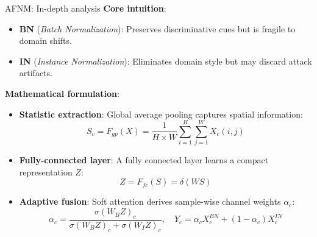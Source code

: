 \begin{frame}[shrink=10]{AFNM: In-depth analysis}
    \footnotesize
    \textbf{Core intuition}: 
    \begin{itemize}
        \item \textbf{BN} (\textit{Batch Normalization}): Preserves discriminative cues but is fragile to domain shifts.
        \item \textbf{IN} (\textit{Instance Normalization}): Eliminates domain style but may discard attack artifacts.
    \end{itemize}
    \vspace{0.2em}
    \textbf{Mathematical formulation}:
    \begin{itemize}
        \item \textbf{Statistic extraction}: Global average pooling captures spatial information:
        \vspace{-0.5em}
        \begin{equation*}
            S_c = F_{gp}(X) = \frac{1}{H \times W} \sum_{i=1}^{H} \sum_{j=1}^{W} X_c(i,j)
        \end{equation*}
        \item \textbf{Fully-connected layer}: A fully connected layer learns a compact representation $Z$:
        \vspace{-0.5em}
        \begin{equation*}
            Z = F_{fc}(S) = \delta(WS)
        \end{equation*}
        \item \textbf{Adaptive fusion}: Soft attention derives sample-wise channel weights $\alpha_c$:
        \vspace{-0.5em}
        \begin{equation*}
            \alpha_c = \frac{\sigma(W_B Z)_c}{\sigma(W_B Z)_c + \sigma(W_I Z)_c}, \quad Y_c = \alpha_c X_{c}^{BN} + (1 - \alpha_c) X_{c}^{IN}
        \end{equation*}
    \end{itemize}
\end{frame}


